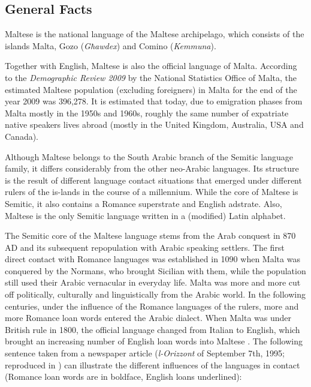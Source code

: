 \documentclass[]{../../metanetpaper}
\begin{document}
\clearpage

\cite{Fabri1en}

\begin{multicols}{2}

\subsection{General Facts}

Maltese is the national language of the Maltese archipelago, which consists of the islands Malta, Gozo (\emph{Għawdex}) and Comino (\emph{Kemmuna}).

Together with English, Maltese is also the official language of Malta. According to the \emph{Demographic Review 2009} by the National Statistics Office of Malta, the estimated Maltese population (excluding foreigners) in Malta for the end of the year 2009 was 396,278. It is estimated that today, due to emigration phases from Malta mostly in the 1950s and 1960s, roughly the same number of expatriate native speakers lives abroad (mostly in the United Kingdom, Australia, USA and Canada).

Although Maltese belongs to the South Arabic branch of the Semitic language family, it differs considerably from the other neo-Arabic languages. Its structure is the result of different language contact situations that emerged under different rulers of the is-lands in the course of a millennium. While the core of Maltese is Semitic, it also contains a Romance superstrate and English adstrate. Also, Maltese is the only Semitic language written in a (modified) Latin alphabet.

The Semitic core of the Maltese language stems from the Arab conquest in 870 AD and its subsequent repopulation with Arabic speaking settlers. The first direct contact with Romance languages was established in 1090 when Malta was conquered by the Normans, who brought Sicilian with them, while the population still used their Arabic vernacular in everyday life. Malta was more and more cut off politically, culturally and linguistically from the Arabic world. In the following centuries, under the influence of the Romance languages of the rulers, more and more Romance loan words entered the Arabic dialect. When Malta was under British rule in 1800, the official language changed from Italian to English, which brought an increasing number of English loan words into Maltese . The following sentence taken from a newspaper article (\emph{l-Orizzont} of September 7th, 1995; reproduced in \cite{Ambros:1998}) can illustrate the different influences of the languages in contact (Romance loan words are in boldface, English loans underlined):


\end{multicols}
\end{document}
